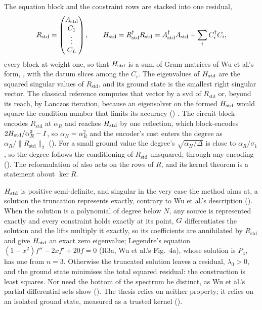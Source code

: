 The equation block and the constraint rows are stacked into one residual,
\begin{equation}
    R_{\mathrm{std}}=\begin{pmatrix}A_{\mathrm{std}}\\ C_1\\ \vdots\\ C_L\end{pmatrix}, \qquad H_{\mathrm{std}}=R_{\mathrm{std}}^{\dagger}R_{\mathrm{std}}=A_{\mathrm{std}}^{\dagger}A_{\mathrm{std}}+\sum_iC_i^{\dagger}C_i ,
    \label{eq:standard-stacked}
\end{equation}
every block at weight one, so that $H_{\mathrm{std}}$ is a sum of Gram matrices of Wu et al.'s form, , with the datum slices among the $C_i$. The eigenvalues of $H_{\mathrm{std}}$ are the squared singular values of $R_{\mathrm{std}}$, and its ground state is the smallest right singular vector. The classical reference computes that vector by a \gls{svd} of $R_{\mathrm{std}}$ or, beyond its reach, by Lanczos iteration, because an eigensolver on the formed $H_{\mathrm{std}}$ would square the condition number that limits its accuracy () \cite{trefethenbau1997}. The circuit block-encodes $R_{\mathrm{std}}$ at $\alpha_R$ and reaches $H_{\mathrm{std}}$ by one reflection, which block-encodes $2H_{\mathrm{std}}/\alpha_R^2-I$, so $\alpha_H=\alpha_R^2$ and the encoder's cost enters the degree as $\alpha_R/\|R_{\mathrm{std}}\|_2$ (). For a small ground value the degree's $\sqrt{\alpha_H/\Delta}$ is close to $\alpha_R/\sigma_1$, so the degree follows the conditioning of $R_{\mathrm{std}}$ unsquared, through any encoding (). The reformulation of  also acts on the rows of $R$, and its kernel theorem is a statement about $\ker R$.

$H_{\mathrm{std}}$ is positive semi-definite, and singular in the very case the method aims at, a solution the truncation represents exactly, contrary to Wu et al.'s description (). When the solution is a polynomial of degree below $N$, any source is represented exactly and every constraint holds exactly at its point, $G$ differentiates the solution and the lifts multiply it exactly, so its coefficients are annihilated by $R_{\mathrm{std}}$ and give $H_{\mathrm{std}}$ an exact zero eigenvalue; Legendre's equation $(1-x^2)f''-2xf'+20f=0$ (R3a, Wu et al.'s Fig.~4a), whose solution is $P_4$, has one from $n=3$. Otherwise the truncated solution leaves a residual, $\lambda_0>0$, and the ground state minimises the total squared residual: the construction is least squares. Nor need the bottom of the spectrum be distinct, as Wu et al.'s partial differential sets show (). The thesis relies on neither property; it relies on an isolated ground state, measured as a trusted kernel ().

